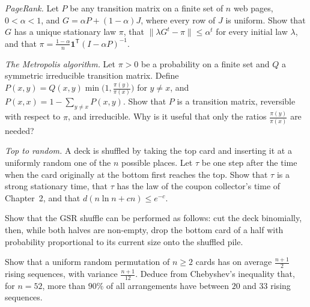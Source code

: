 \begin{exercise}[$\star\star$]\label{ex:pagerank}
\emph{PageRank.} Let $P$ be any transition matrix on a finite set of $n$ web pages, $0<\alpha<1$, and $G=\alpha P+(1-\alpha)J$, where every row of $J$ is
uniform. Show that $G$ has a unique stationary law $\pi$, that $\|\lambda G^t-\pi\|\le\alpha^t$ for every initial law $\lambda$, and that $\pi=\frac{1-\alpha}n\mathbf 1^{\mathsf T}(I-\alpha P)^{-1}$.
\end{exercise}

\begin{exercise}[$\star\star$]\label{ex:metropolis}
\emph{The Metropolis algorithm.} Let $\pi>0$ be a probability on a finite set and $Q$ a symmetric irreducible transition matrix. Define
$P(x,y)=Q(x,y)\min\bigl(1,\frac{\pi(y)}{\pi(x)}\bigr)$ for $y\ne x$, and $P(x,x)=1-\sum_{y\ne x}P(x,y)$. Show that $P$ is a transition matrix, reversible with respect to
$\pi$, and irreducible. Why is it useful that only the ratios $\frac{\pi(y)}{\pi(x)}$ are needed?
\end{exercise}

\begin{exercise}[$\star\star$]\label{ex:toptorandom}
\emph{Top to random.} A deck is shuffled by taking the top card and inserting it at a uniformly random one of the $n$ possible
places. Let $\tau$ be one step after the time when the card originally at the bottom first reaches the top. Show that $\tau$ is a
strong stationary time, that $\tau$ has the law of the coupon collector's time of Chapter~2, and that $d(n\ln n+cn)\le e^{-c}$.
\end{exercise}

\begin{exercise}[$\star$]\label{ex:gsr}
Show that the GSR shuffle can be performed as follows: cut the deck binomially, then, while both halves are non-empty,
drop the bottom card of a half with probability proportional to its current size onto the shuffled pile.
\end{exercise}

\begin{exercise}[$\star\star$]\label{ex:risingmean}
Show that a uniform random permutation of $n\ge2$ cards has on average $\frac{n+1}2$ rising sequences, with variance $\frac{n+1}{12}$. Deduce from
Chebyshev's inequality that, for $n=52$, more than $90\%$ of all arrangements have between $20$ and $33$ rising sequences.
\end{exercise}

